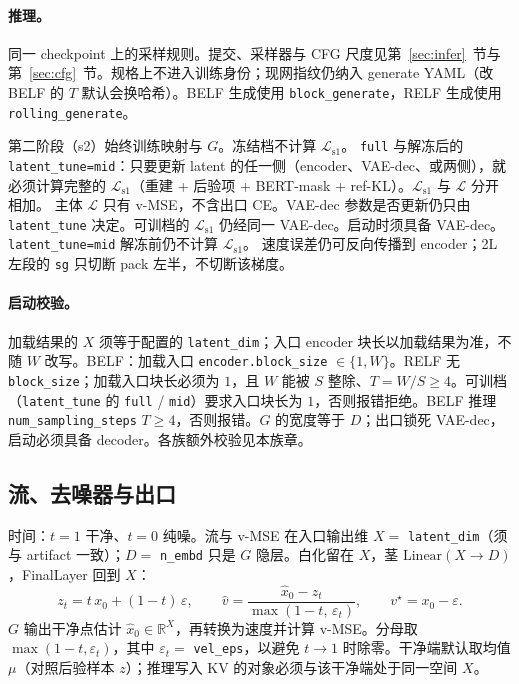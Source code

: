 \documentclass[UTF8,a4paper,11pt]{ctexart}
\begin{document}
\paragraph{推理。}
同一 checkpoint 上的采样规则。提交、采样器与 CFG 尺度见第~\ref{sec:infer}~节与第~\ref{sec:cfg}~节。规格上不进入训练身份；现网指纹仍纳入 generate YAML（改 BELF 的 \(T\) 默认会换哈希）。BELF 生成使用 \texttt{block\_generate}，RELF 生成使用 \texttt{rolling\_generate}。

第二阶段（s2）始终训练映射与 \(G\)。冻结档不计算 \(\mathcal{L}_{\mathrm{s1}}\)。
\texttt{full} 与解冻后的 \texttt{latent\_tune=mid}：只要更新 latent 的任一侧（encoder、VAE-dec、或两侧），就必须计算完整的 \(\mathcal{L}_{\mathrm{s1}}\)（重建 + 后验项 + BERT-mask + ref-KL）。\(\mathcal{L}_{\mathrm{s1}}\) 与 \(\mathcal{L}\) 分开相加。
主体 \(\mathcal{L}\) 只有 v-MSE，不含出口 CE。VAE-dec 参数是否更新仍只由 \texttt{latent\_tune} 决定。可训档的 \(\mathcal{L}_{\mathrm{s1}}\) 仍经同一 VAE-dec。启动时须具备 VAE-dec。\texttt{latent\_tune=mid} 解冻前仍不计算 \(\mathcal{L}_{\mathrm{s1}}\)。
速度误差仍可反向传播到 encoder；2L 左段的 \texttt{sg} 只切断 pack 左半，不切断该梯度。

\paragraph{启动校验。}
加载结果的 \(X\) 须等于配置的 \texttt{latent\_dim}；入口 encoder 块长以加载结果为准，不随 \(W\) 改写。BELF：加载入口 \texttt{encoder.block\_size} \(\in\{1,W\}\)。RELF 无 \texttt{block\_size}；加载入口块长必须为 \(1\)，且 \(W\) 能被 \(S\) 整除、\(T=W/S\ge 4\)。可训档（\texttt{latent\_tune} 的 \texttt{full} / \texttt{mid}）要求入口块长为 \(1\)，否则报错拒绝。BELF 推理 \texttt{num\_sampling\_steps} \(T\ge 4\)，否则报错。\(G\) 的宽度等于 \(D\)；出口锁死 VAE-dec，启动必须具备 decoder。各族额外校验见本族章。

\subsection{流、去噪器与出口}

时间：\(t=1\) 干净、\(t=0\) 纯噪。流与 v-MSE 在入口输出维 \(X=\) \texttt{latent\_dim}（须与 artifact 一致）；\(D=\) \texttt{n\_embd} 只是 \(G\) 隐层。白化留在 \(X\)，茎 \(\mathrm{Linear}(X\to D)\)，FinalLayer 回到 \(X\)：
\[
z_t=t\,x_0+(1-t)\,\varepsilon,\qquad
\hat v=\frac{\hat x_0-z_t}{\max(1-t,\,\varepsilon_t)},\qquad
v^\star=x_0-\varepsilon.
\]
\(G\) 输出干净点估计 \(\hat x_0\in\mathbb{R}^{X}\)，再转换为速度并计算 v-MSE。分母取 \(\max(1-t,\varepsilon_t)\)，其中 \(\varepsilon_t=\) \texttt{vel\_eps}，以避免 \(t\to 1\) 时除零。干净端默认取均值 \(\mu\)（对照后验样本 \(z\)）；推理写入 KV 的对象必须与该干净端处于同一空间 \(X\)。
\end{document}
